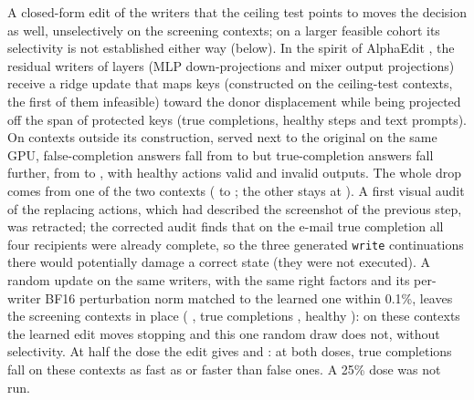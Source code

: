 A closed-form edit of the writers that the ceiling test points to moves the decision as well, unselectively on the screening contexts; on a larger feasible cohort its selectivity is not established either way (below). In the spirit of AlphaEdit \citep{fang2024alphaedit}, the \alphaNWriters{} residual writers of layers \alphaLayers{} (MLP down-projections and mixer output projections) receive a ridge update that maps \fsp{} keys (constructed on the ceiling-test contexts, the first of them infeasible) toward the donor displacement while being projected off the span of protected keys (true completions, healthy steps and text prompts). On contexts outside its construction, served next to the original on the same GPU, false-completion answers fall from \alphaOrigFsp{} to \alphaEditFsp{} but true-completion answers fall further, from \alphaOrigFsm{} to \alphaEditFsm, with \alphaEditHealthy{} healthy actions valid and \alphaEditInv{} invalid outputs. The whole \fsp{} drop comes from one of the two contexts (\alphaOrigFspCtxB{} to \alphaEditFspCtxB; the other stays at \alphaEditFspCtxA). A first visual audit of the replacing actions, which had described the screenshot of the previous step, was retracted; the corrected audit finds that on the e-mail true completion all four recipients were already complete, so the three generated \texttt{write} continuations there would potentially damage a correct state (they were not executed). %
A random update on the same writers, with the same right factors and its per-writer BF16 perturbation norm matched to the learned one within 0.1\%, leaves the screening contexts in place (\fsp{} \alphaRandFsp, true completions \alphaRandFsm, healthy \alphaRandHealthy): on these contexts the learned edit moves stopping and this one random draw does not, without selectivity. %
At half the dose the edit gives \alphaHalfFsp{} and \alphaHalfFsm: at both doses, true completions fall on these contexts as fast as or faster than false ones. %
A 25\% dose was not run.

